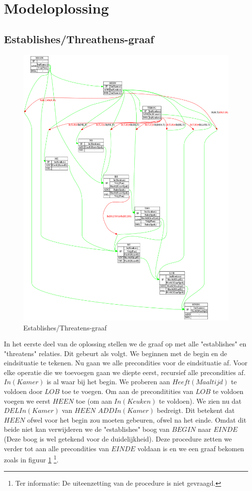 \documentclass[alternative-exam.tex]{subfiles}
\begin{document}
\section{Modeloplossing}
\subsection{Establishes/Threathens-graaf}
\begin{figure}[p]
\centering
\caption{Establishes/Threatens-graaf}
\label{strips_1}
\includegraphics[scale=0.25]{resources/graphs/strips_1.png}
\end{figure}
In het eerste deel van de oplossing stellen we de graaf op met alle "establishes" en "threatens" relaties. Dit gebeurt als volgt. We beginnen met de begin en de eindsituatie te tekenen. Nu gaan we alle precondities voor de eindsituatie af. Voor elke operatie die we toevoegen gaan we diepte eerst, recursief alle precondities af. $In(Kamer)$ is al waar bij het begin. We proberen aan $Heeft(Maaltijd)$ te voldoen door $LOB$ toe te voegen. Om aan de preconditities van $LOB$ te voldoen voegen we eerst $HEEN$ toe (om aan $In(Keuken)$ te voldoen). We zien nu dat $DEL In(Kamer)$ van $HEEN$ $ADD In(Kamer)$ bedreigt. Dit betekent dat $HEEN$ ofwel voor het begin zou moeten gebeuren, ofwel na het einde. Omdat dit beide niet kan verwijderen we de "establishes" boog van $BEGIN$ naar $EINDE$ (Deze boog is wel getekend voor de duidelijkheid). Deze procedure zetten we verder tot aan alle precondities van $EINDE$ voldaan is en we een graaf bekomen zoals in figuur \ref{strips_1} \footnote{Ter informatie: De uiteenzetting van de procedure is niet gevraagd.}.
\end{document}
